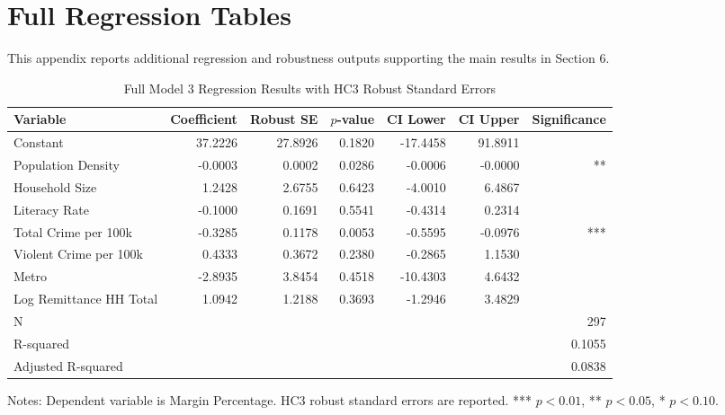\documentclass[12pt,a4paper]{article}
\begin{document}
\section{Full Regression Tables}

This appendix reports additional regression and robustness outputs supporting the main results in Section 6.

\begin{table}[H]
\centering
\caption{Full Model 3 Regression Results with HC3 Robust Standard Errors}
\label{tab:appendix_model3_full}
\footnotesize
\begin{tabular}{lrrrrrr}
\toprule
Variable & Coefficient & Robust SE & $p$-value & CI Lower & CI Upper & Significance \\
\midrule
Constant & 37.2226 & 27.8926 & 0.1820 & -17.4458 & 91.8911 &  \\
Population Density & -0.0003 & 0.0002 & 0.0286 & -0.0006 & -0.0000 & ** \\
Household Size & 1.2428 & 2.6755 & 0.6423 & -4.0010 & 6.4867 &  \\
Literacy Rate & -0.1000 & 0.1691 & 0.5541 & -0.4314 & 0.2314 &  \\
Total Crime per 100k & -0.3285 & 0.1178 & 0.0053 & -0.5595 & -0.0976 & *** \\
Violent Crime per 100k & 0.4333 & 0.3672 & 0.2380 & -0.2865 & 1.1530 &  \\
Metro & -2.8935 & 3.8454 & 0.4518 & -10.4303 & 4.6432 &  \\
Log Remittance HH Total & 1.0942 & 1.2188 & 0.3693 & -1.2946 & 3.4829 &  \\
\midrule
N & \multicolumn{6}{r}{297} \\
R-squared & \multicolumn{6}{r}{0.1055} \\
Adjusted R-squared & \multicolumn{6}{r}{0.0838} \\
\bottomrule
\end{tabular}
\begin{flushleft}
\footnotesize Notes: Dependent variable is Margin Percentage. HC3 robust standard errors are reported. *** $p<0.01$, ** $p<0.05$, * $p<0.10$.
\end{flushleft}
\end{table}
\end{document}
